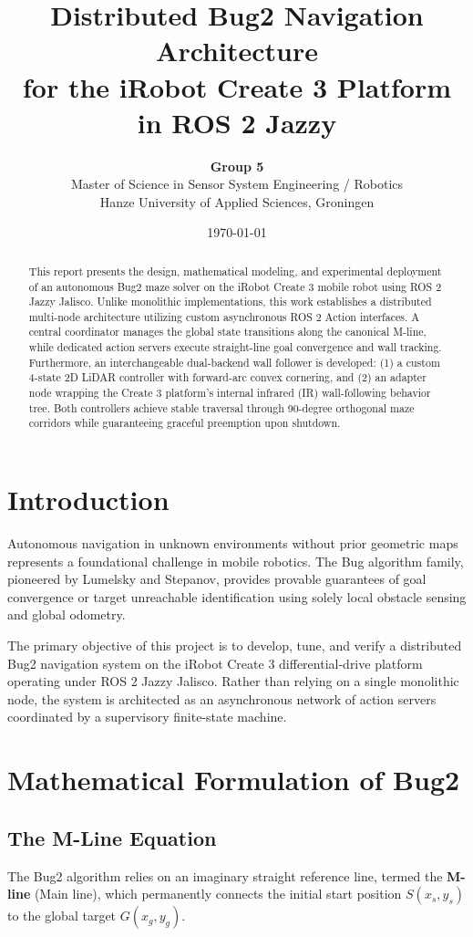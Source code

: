 \documentclass[11pt,a4paper]{article}
\title{\textbf{Distributed Bug2 Navigation Architecture\\for the iRobot Create 3 Platform in ROS 2 Jazzy}}
\author{\textbf{Group 5} \\ 
Master of Science in Sensor System Engineering / Robotics \\ 
Hanze University of Applied Sciences, Groningen}
\date{\today}
\begin{document}
\maketitle

\begin{abstract}
This report presents the design, mathematical modeling, and experimental deployment of an autonomous Bug2 maze solver on the iRobot Create 3 mobile robot using ROS 2 Jazzy Jalisco. Unlike monolithic implementations, this work establishes a distributed multi-node architecture utilizing custom asynchronous ROS 2 Action interfaces. A central coordinator manages the global state transitions along the canonical M-line, while dedicated action servers execute straight-line goal convergence and wall tracking. Furthermore, an interchangeable dual-backend wall follower is developed: (1) a custom 4-state 2D LiDAR controller with forward-arc convex cornering, and (2) an adapter node wrapping the Create 3 platform's internal infrared (IR) wall-following behavior tree. Both controllers achieve stable traversal through 90-degree orthogonal maze corridors while guaranteeing graceful preemption upon shutdown.
\end{abstract}

\section{Introduction}
Autonomous navigation in unknown environments without prior geometric maps represents a foundational challenge in mobile robotics. The Bug algorithm family, pioneered by Lumelsky and Stepanov, provides provable guarantees of goal convergence or target unreachable identification using solely local obstacle sensing and global odometry. 

The primary objective of this project is to develop, tune, and verify a distributed Bug2 navigation system on the iRobot Create 3 differential-drive platform operating under ROS 2 Jazzy Jalisco. Rather than relying on a single monolithic node, the system is architected as an asynchronous network of action servers coordinated by a supervisory finite-state machine.

\section{Mathematical Formulation of Bug2}

\subsection{The M-Line Equation}
The Bug2 algorithm relies on an imaginary straight reference line, termed the \textbf{M-line} (Main line), which permanently connects the initial start position $S(x_s, y_s)$ to the global target $G(x_g, y_g)$. 
\end{document}

